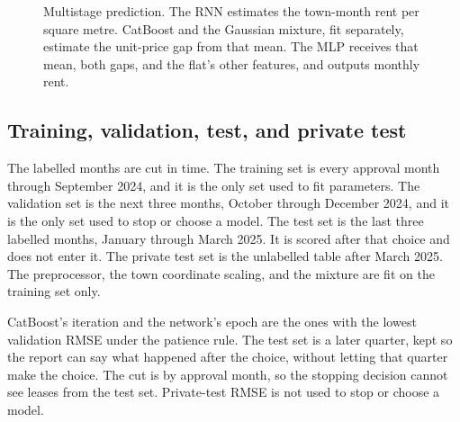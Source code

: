 \documentclass[11pt]{article}
\begin{document}
\begin{figure}[ht]
\centering
{}
\caption{Multistage prediction.
The RNN estimates the town-month rent per square metre.
CatBoost and the Gaussian mixture, fit separately, estimate the unit-price gap from that mean.
The MLP receives that mean, both gaps, and the flat's other features, and outputs monthly rent.}
\label{fig:stack}
\end{figure}

\subsection{Training, validation, test, and private test}

The labelled months are cut in time.
The training set is every approval month through September 2024, and it is the only set used to fit parameters.
The validation set is the next three months, October through December 2024, and it is the only set used to stop or choose a model.
The test set is the last three labelled months, January through March 2025.
It is scored after that choice and does not enter it.
The private test set is the unlabelled table after March 2025.
The preprocessor, the town coordinate scaling, and the mixture are fit on the training set only.

CatBoost's iteration and the network's epoch are the ones with the lowest validation RMSE under the patience rule.
The test set is a later quarter, kept so the report can say what happened after the choice, without letting that quarter make the choice.
The cut is by approval month, so the stopping decision cannot see leases from the test set.
Private-test RMSE is not used to stop or choose a model.
\end{document}
